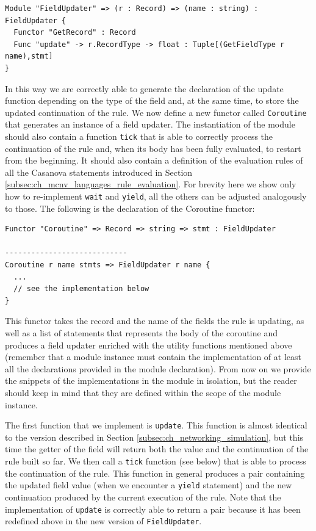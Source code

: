 \begin{lstlisting}
Module "FieldUpdater" => (r : Record) => (name : string) : FieldUpdater {
  Functor "GetRecord" : Record
  Func "update" -> r.RecordType -> float : Tuple[(GetFieldType r name),stmt]
}
\end{lstlisting}

\noindent
In this way we are correctly able to generate the declaration of the update function depending on the type of the field and, at the same time, to store the updated continuation of the rule. We now define a new functor called \texttt{Coroutine} that generates an instance of a field updater. The instantiation of the module should also contain a function \texttt{tick} that is able to correctly process the continuation of the rule and, when its body has been fully evaluated, to restart from the beginning. It should also contain a definition of the evaluation rules of all the Casanova statements introduced in Section \ref{subsec:ch_mcnv_languages_rule_evaluation}. For brevity here we show only how to re-implement \texttt{wait} and \texttt{yield}, all the others can be adjusted analogously to those. The following is the declaration of the Coroutine functor:

\begin{lstlisting}
Functor "Coroutine" => Record => string => stmt : FieldUpdater

----------------------------
Coroutine r name stmts => FieldUpdater r name {
  ... 
  // see the implementation below
}
\end{lstlisting}

\noindent
This functor takes the record and the name of the fields the rule is updating, as well as a list of statements that represents the body of the coroutine and produces a field updater enriched with the utility functions mentioned above (remember that a module instance must contain the implementation of at least all the declarations provided in the module declaration). From now on we provide the snippets of the implementations in the module in isolation, but the reader should keep in mind that they are defined within the scope of the module instance. 

The first function that we implement is \texttt{update}. This function is almost identical to the version described in Section \ref{subsec:ch_networking_simulation}, but this time the getter of the field will return both the value and the continuation of the rule built so far. We then call a \texttt{tick} function (see below) that is able to process the continuation of the rule. This function in general produces a pair containing the updated field value (when we encounter a \texttt{yield} statement) and the new continuation produced by the current execution of the rule. Note that the implementation of \texttt{update} is correctly able to return a pair because it has been redefined above in the new version of \texttt{FieldUpdater}.

